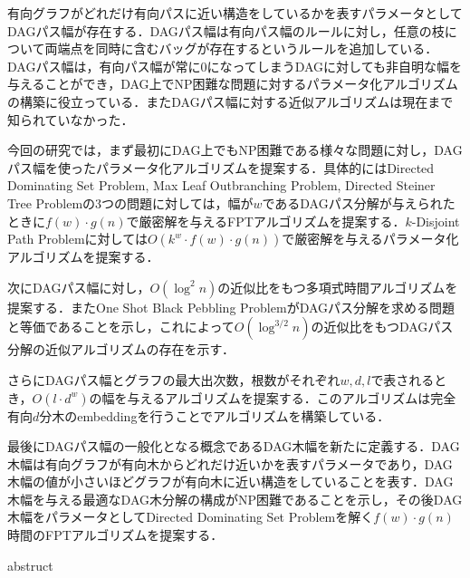 \documentclass[master]{kuisthesis}		%
\theoremstyle{plain}
\theoremstyle{definition}
\begin{document}
\begin{jabstract}
有向グラフがどれだけ有向パスに近い構造をしているかを表すパラメータとしてDAGパス幅が存在する．DAGパス幅は有向パス幅のルールに対し，任意の枝について両端点を同時に含むバッグが存在するというルールを追加している．DAGパス幅は，有向パス幅が常に0になってしまうDAGに対しても非自明な幅を与えることができ，DAG上でNP困難な問題に対するパラメータ化アルゴリズムの構築に役立っている．またDAGパス幅に対する近似アルゴリズムは現在まで知られていなかった．


今回の研究では，まず最初にDAG上でもNP困難である様々な問題に対し，DAGパス幅を使ったパラメータ化アルゴリズムを提案する．具体的にはDirected Dominating Set Problem, Max Leaf Outbranching Problem, Directed Steiner Tree Problemの3つの問題に対しては，幅が$w$であるDAGパス分解が与えられたときに$f(w)\cdot g(n)$で厳密解を与えるFPTアルゴリズムを提案する．$k$-Disjoint Path Problemに対しては$O(k^w\cdot f(w)\cdot g(n))$で厳密解を与えるパラメータ化アルゴリズムを提案する．

次にDAGパス幅に対し，$O(\log^2 n)$の近似比をもつ多項式時間アルゴリズムを提案する．またOne Shot Black Pebbling ProblemがDAGパス分解を求める問題と等価であることを示し，これによって$O(\log^{3/2} n)$の近似比をもつDAGパス分解の近似アルゴリズムの存在を示す．

さらにDAGパス幅とグラフの最大出次数，根数がそれぞれ$w, d, l$で表されるとき，$O(l\cdot d^w)$の幅を与えるアルゴリズムを提案する．このアルゴリズムは完全有向$d$分木のembeddingを行うことでアルゴリズムを構築している．


最後にDAGパス幅の一般化となる概念であるDAG木幅を新たに定義する．DAG木幅は有向グラフが有向木からどれだけ近いかを表すパラメータであり，DAG木幅の値が小さいほどグラフが有向木に近い構造をしていることを表す．DAG木幅を与える最適なDAG木分解の構成がNP困難であることを示し，その後DAG木幅をパラメータとしてDirected Dominating Set Problemを解く$f(w)\cdot g(n)$時間のFPTアルゴリズムを提案する．

\end{jabstract}











\begin{eabstract}				%
abstruct
\end{eabstract}
\end{document}
